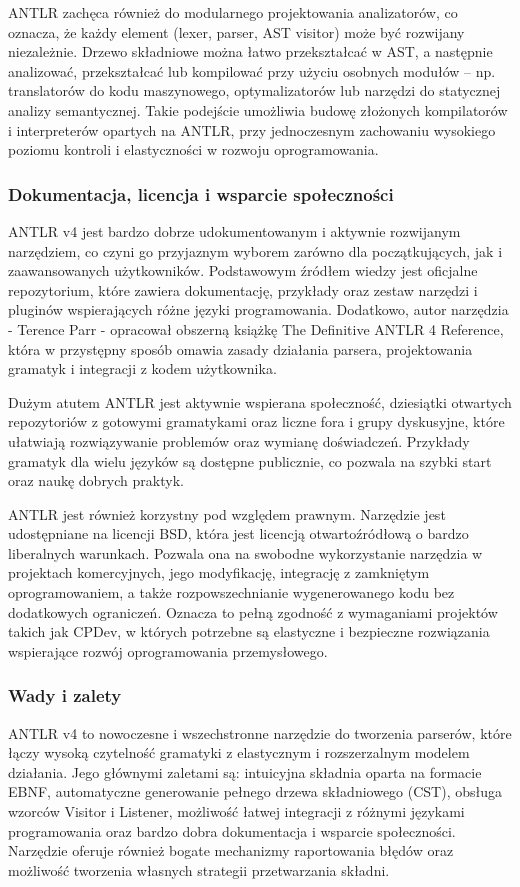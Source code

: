 \documentclass[12pt,twoside]{article}
\begin{document}
ANTLR zachęca również do modularnego projektowania analizatorów, co oznacza, że każdy element (lexer, parser, AST visitor) może być rozwijany niezależnie. Drzewo składniowe można łatwo przekształcać w AST, a następnie analizować, przekształcać lub kompilować przy użyciu osobnych modułów – np. translatorów do kodu maszynowego, optymalizatorów lub narzędzi do statycznej analizy semantycznej. Takie podejście umożliwia budowę złożonych kompilatorów i interpreterów opartych na ANTLR, przy jednoczesnym zachowaniu wysokiego poziomu kontroli i elastyczności w rozwoju oprogramowania.

\subsubsection{Dokumentacja, licencja i wsparcie społeczności}
ANTLR v4 jest bardzo dobrze udokumentowanym i aktywnie rozwijanym narzędziem, co czyni go przyjaznym wyborem zarówno dla początkujących, jak i zaawansowanych użytkowników. Podstawowym źródłem wiedzy jest oficjalne repozytorium, które zawiera dokumentację, przykłady oraz zestaw narzędzi i pluginów wspierających różne języki programowania. Dodatkowo, autor narzędzia - Terence Parr - opracował obszerną książkę The Definitive ANTLR 4 Reference, która w przystępny sposób omawia zasady działania parsera, projektowania gramatyk i integracji z kodem użytkownika.

Dużym atutem ANTLR jest aktywnie wspierana społeczność, dziesiątki otwartych repozytoriów z gotowymi gramatykami oraz liczne fora i grupy dyskusyjne, które ułatwiają rozwiązywanie problemów oraz wymianę doświadczeń. Przykłady gramatyk dla wielu języków są dostępne publicznie, co pozwala na szybki start oraz naukę dobrych praktyk.

ANTLR jest również korzystny pod względem prawnym. Narzędzie jest udostępniane na licencji BSD, która jest licencją otwartoźródłową o bardzo liberalnych warunkach. Pozwala ona na swobodne wykorzystanie narzędzia w projektach komercyjnych, jego modyfikację, integrację z zamkniętym oprogramowaniem, a także rozpowszechnianie wygenerowanego kodu bez dodatkowych ograniczeń. Oznacza to pełną zgodność z wymaganiami projektów takich jak CPDev, w których potrzebne są elastyczne i bezpieczne rozwiązania wspierające rozwój oprogramowania przemysłowego.

\subsubsection{Wady i zalety}
ANTLR v4 to nowoczesne i wszechstronne narzędzie do tworzenia parserów, które łączy wysoką czytelność gramatyki z elastycznym i rozszerzalnym modelem działania. Jego głównymi zaletami są: intuicyjna składnia oparta na formacie EBNF, automatyczne generowanie pełnego drzewa składniowego (CST), obsługa wzorców Visitor i Listener, możliwość łatwej integracji z różnymi językami programowania oraz bardzo dobra dokumentacja i wsparcie społeczności. Narzędzie oferuje również bogate mechanizmy raportowania błędów oraz możliwość tworzenia własnych strategii przetwarzania składni.
\end{document}
